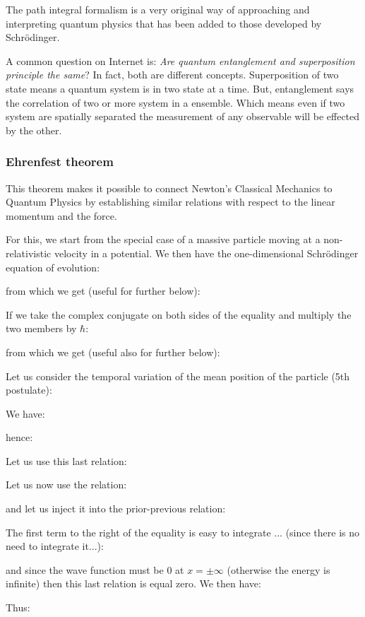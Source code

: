 	The path integral formalism is a very original way of approaching and interpreting quantum physics that has been added to those developed by Schrödinger.	 
	\begin{tcolorbox}[title=Remark,colframe=black,arc=10pt]
	A common question on Internet is: \textit{Are quantum entanglement and superposition principle the same}? In fact, both are different concepts. Superposition of two state means a quantum system is in two state at a time. But, entanglement says the correlation of two or more system in a ensemble. Which means even if two system are spatially separated the measurement of any observable will be effected by the other.
	\end{tcolorbox}
	
	\pagebreak
	\subsubsection{Ehrenfest theorem}
	This theorem makes it possible to connect Newton's Classical Mechanics to Quantum Physics by establishing similar relations with respect to the linear momentum and the force.

	For this, we start from the special case of a massive particle moving at a non-relativistic velocity in a potential. We then have the one-dimensional Schrödinger equation of evolution:
	
	from which we get (useful for further below):
	
	If we take the complex conjugate on both sides of the equality and multiply the two members by $\hbar$:
	
	from which we get (useful also for further below):
	
	Let us consider the temporal variation of the mean position of the particle (5th postulate):
	
	We have:
	
	hence:
	
	Let us use this last relation:
	
	Let us now use the relation:
	
	and let us inject it into the prior-previous relation:
	
	The first term to the right of the equality is easy to integrate ... (since there is no need to integrate it...):
	
	and since the wave function must be $0$ at $x=\pm \infty$  (otherwise the energy is infinite) then this last relation is equal zero. We then have:
	
	Thus:
	
